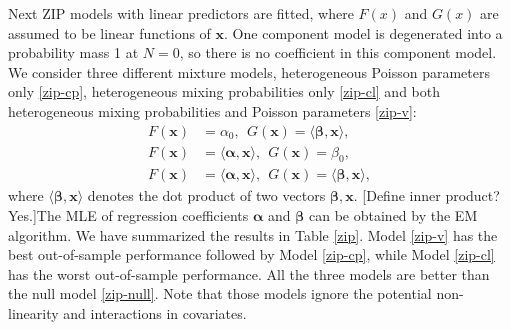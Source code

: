 \documentclass[11pt]{article}
\numberwithin{equation}{section}
\def\bx{\boldsymbol{x}}
\begin{document}
Next ZIP models with linear predictors are fitted, where $F(x)$ and $G(x)$ are assumed to be linear functions of $\bx$.
One component model is degenerated into a probability mass 1 at $N=0$, so there is no coefficient in this component model. 
We consider three different mixture models, heterogeneous Poisson parameters only \eqref{zip-cp}, heterogeneous mixing probabilities only \eqref{zip-cl} and both heterogeneous  mixing probabilities and Poisson parameters \eqref{zip-v}:
\begin{align}
	F(\bx)&=\alpha_0, ~~G(\bx)=\langle \boldsymbol{\beta}, \bx\rangle, \label{zip-cp} \\
	F(\bx)&=\langle \boldsymbol{\alpha},\bx\rangle, ~~G(\bx)=\beta_0, \label{zip-cl} \\
	F(\bx)&=\langle \boldsymbol{\alpha},\bx \rangle, ~~G(\bx)=\langle \boldsymbol{\beta}, \bx \rangle, \label{zip-v}
\end{align}  
where $\langle \boldsymbol{\beta}, \bx \rangle$ denotes the dot product of two vectors $\boldsymbol{\beta}, \bx$.
{\color{blue}[Define inner product? Yes.]}The MLE of regression coefficients $\boldsymbol{\alpha}$ and $\boldsymbol{\beta}$ can be obtained by the EM algorithm.
We have summarized the results in Table \ref{zip}.
Model \eqref{zip-v} has the best out-of-sample performance followed by Model \eqref{zip-cp}, while Model \eqref{zip-cl} has the worst out-of-sample performance.
All the three models are better than the null model \eqref{zip-null}.
Note that those models ignore the potential non-linearity and interactions in covariates.
\end{document}
